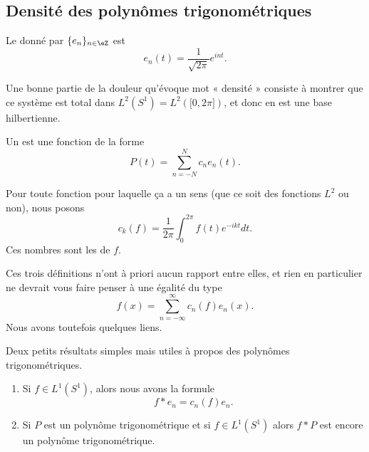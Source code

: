 \subsection{Densité des polynômes trigonométriques}

\begin{definition}      \label{DEFooGCZAooFecAHB}
	Le  donné par \( \{ e_n \}_{n\in \eZ}\) est
	\begin{equation}
		e_n(t)= \frac{1}{ \sqrt{ 2\pi } } e^{int}.
	\end{equation}
\end{definition}

Une bonne partie de la douleur qu'évoque mot « densité » consiste à montrer que ce système est total dans \( L^2(S^1)=L^2(\mathopen[ 0 , 2\pi \mathclose])\), et donc en est une base hilbertienne.

\begin{definition}
	Un  est une fonction de la forme
	\begin{equation}
		P(t)=\sum_{n=-N}^Nc_n e_n(t).
	\end{equation}
\end{definition}

\begin{definition}     \label{DEFooZDUKooRnYhhF}
	Pour toute fonction pour laquelle ça a un sens (que ce soit des fonctions \( L^2\) ou non), nous posons
	\begin{equation}\label{EqhIPoPH}
		c_k(f)=\frac{1}{ 2\pi }\int_{0}^{2\pi}f(t) e^{-ikt}dt.
	\end{equation}
	Ces nombres sont les  de \( f\).
\end{definition}

Ces trois définitions n'ont à priori aucun rapport entre elles, et rien en particulier ne devrait vous faire penser à une égalité du type
\begin{equation}
	f(x)=\sum_{n=-\infty}^{\infty}c_n(f)e_n(x).
\end{equation}
Nous avons toutefois quelques liens.

\begin{lemma}   \label{LemZVfZlms}
	Deux petits résultats simples mais utiles à propos des polynômes trigonométriques.
	\begin{enumerate}
		\item
		      Si \( f\in L^1(S^1)\), alors nous avons la formule
		      \begin{equation}
			      f*e_n=c_n(f)e_n.
		      \end{equation}
		\item

		      Si \( P\) est un polynôme trigonométrique et si \( f\in L^1(S^1)\) alors \( f*P\) est encore un polynôme trigonométrique.
	\end{enumerate}
\end{lemma}


